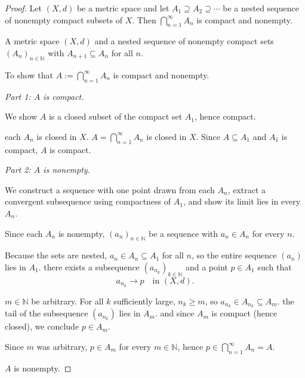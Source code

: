 \begin{proof}
\Claim Let $(X,d)$ be a metric space and let $A_1 \supseteq A_2 \supseteq \cdots$
be a nested sequence of nonempty compact subsets of $X$. Then
$\bigcap_{n=1}^{\infty} A_n$ is compact and nonempty.

\Given A metric space $(X,d)$ and a nested sequence of nonempty compact sets
$(A_n)_{n \in \mathbb{N}}$ with $A_{n+1} \subseteq A_n$ for all $n$.

\Goal To show that $A := \bigcap_{n=1}^{\infty} A_n$ is compact and nonempty.

\medskip
\noindent\textit{Part 1: $A$ is compact.}

\Strategy We show $A$ is a closed subset of the compact set $A_1$, hence compact.

 each $A_n$ is closed in $X$.
$A = \bigcap_{n=1}^{\infty} A_n$ is closed in $X$.
Since $A \subseteq A_1$ and $A_1$ is compact,
$A$ is compact. \checkbox

\medskip
\noindent\textit{Part 2: $A$ is nonempty.}

\Strategy We construct a sequence with one point drawn from each $A_n$, extract
a convergent subsequence using compactness of $A_1$, and show its limit lies in
every $A_n$.

Since each $A_n$ is nonempty, \Let $(a_n)_{n \in \mathbb{N}}$ be a sequence with
$a_n \in A_n$ for every $n$.

Because the sets are nested, $a_n \in A_n \subseteq A_1$ for all $n$,
so the entire sequence $(a_n)$ lies in $A_1$.
 there exists a subsequence
$(a_{n_k})_{k \in \mathbb{N}}$ and a point $p \in A_1$ such that
\[
  a_{n_k} \to p \quad \text{in } (X,d).
\]

\Let $m \in \mathbb{N}$ be arbitrary. For all $k$ sufficiently large, $n_k \geq m$,
so $a_{n_k} \in A_{n_k} \subseteq A_m$. \Therefore the tail of the subsequence
$(a_{n_k})$ lies in $A_m$.
and since $A_m$ is compact (hence closed), we conclude $p \in A_m$.

Since $m$ was arbitrary, $p \in A_m$ for every $m \in \mathbb{N}$,
hence $p \in \bigcap_{n=1}^{\infty} A_n = A$. \checkbox

\Hence $A$ is nonempty. \AsReq
\end{proof}

